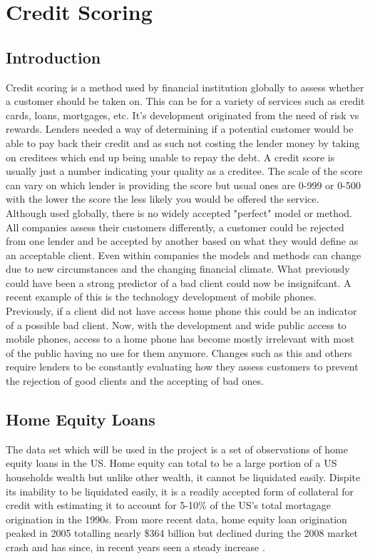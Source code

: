 \chapter{Credit Scoring}

\section{Introduction}
Credit scoring is a method used by financial institution globally to assess whether a customer should be taken on. This can be for a variety of services such as credit cards, loans, mortgages, etc. It's development originated from the need of risk vs rewards. Lenders needed a way of determining if a potential customer would be able to pay back their credit and as such not costing the lender money by taking on creditees which end up being unable to repay the debt. A credit score is usually just a number indicating your quality as a creditee. The scale of the score can vary on which lender is providing the score but usual ones are 0-999 or 0-500 with the lower the score the less likely you would be offered the service. \\

Although used globally, there is no widely accepted "perfect" model or method. All companies assess their customers differently, a customer could be rejected from one lender and be accepted by another based on what they would define as an acceptable client. Even within companies the models and methods can change due to new circumstances and the changing financial climate. What previously could have been a strong predictor of a bad client could now be insignifcant. A recent example of this is the technology development of mobile phones. Previously, if a client did not have access home phone this could be an indicator of a possible bad client. Now, with the development and wide public access to mobile phones, access to a home phone has become mostly irrelevant with most of the public having no use for them anymore. Changes such as this and others require lenders to be constantly evaluating how they assess customers to prevent the rejection of good clients and the accepting of bad ones.

\section{Home Equity Loans}
The data set which will be used in the project is a set of observations of home equity loans in the US. Home equity can total to be a large portion of a US households wealth but unlike other wealth, it cannot be liquidated easily. Dispite its inability to be liquidated easily, it is a readily accepted form of collateral for credit \parencite{canner1998recent} with \parencite{weicher1997home} estimating it to account for 5-10\% of the US's total mortagage origination in the 1990s. From more recent data, home equity loan origination peaked in 2005 totalling nearly \$364 billion but declined during the 2008 market crash and has since, in recent years seen a steady increase \parencite{corelogic2016home}. \\

